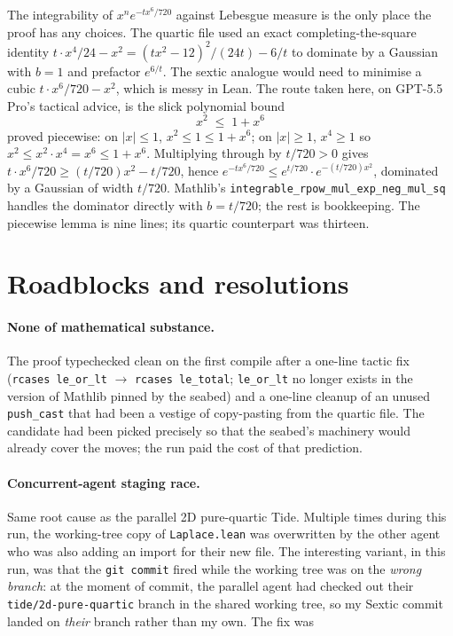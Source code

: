 \documentclass[11pt]{article}
\begin{document}
The integrability of $x^n e^{-t x^6/720}$ against Lebesgue measure is
the only place the proof has any choices. The quartic file used an exact
completing-the-square identity
$t \cdot x^4/24 - x^2 = (tx^2 - 12)^2/(24t) - 6/t$
to dominate by a Gaussian with $b = 1$ and prefactor $e^{6/t}$. The sextic
analogue would need to minimise a cubic $t \cdot x^6/720 - x^2$, which is
messy in Lean. The route taken here, on GPT-5.5 Pro's tactical advice, is
the slick polynomial bound
\[
  x^2 \;\leq\; 1 + x^6
\]
proved piecewise: on $|x| \leq 1$, $x^2 \leq 1 \leq 1 + x^6$; on
$|x| \geq 1$, $x^4 \geq 1$ so $x^2 \leq x^2 \cdot x^4 = x^6 \leq 1 + x^6$.
Multiplying through by $t/720 > 0$ gives
$t \cdot x^6/720 \geq (t/720) x^2 - t/720$, hence
$e^{-t x^6/720} \leq e^{t/720} \cdot e^{-(t/720) x^2}$, dominated by a
Gaussian of width $t/720$. Mathlib's
\texttt{integrable\_rpow\_mul\_exp\_neg\_mul\_sq} handles the dominator
directly with $b = t/720$; the rest is bookkeeping. The piecewise lemma is
nine lines; its quartic counterpart was thirteen.

\section{Roadblocks and resolutions}

\paragraph{None of mathematical substance.} The proof typechecked clean on
the first compile after a one-line tactic fix
(\texttt{rcases le\_or\_lt} $\to$ \texttt{rcases le\_total}; \texttt{le\_or\_lt}
no longer exists in the version of Mathlib pinned by the seabed) and a
one-line cleanup of an unused \texttt{push\_cast} that had been a vestige of
copy-pasting from the quartic file. The candidate had been picked precisely
so that the seabed's machinery would already cover the moves; the run paid
the cost of that prediction.

\paragraph{Concurrent-agent staging race.} Same root cause as the parallel
2D pure-quartic Tide. Multiple times during this run, the working-tree copy
of \texttt{Laplace.lean} was overwritten by the other agent who was also
adding an import for their new file. The interesting variant, in this run,
was that the \texttt{git commit} fired while the working tree was on the
\emph{wrong branch}: at the moment of commit, the parallel agent had checked
out their \texttt{tide/2d-pure-quartic} branch in the shared working tree, so
my Sextic commit landed on \emph{their} branch rather than my own. The fix
was
\end{document}
